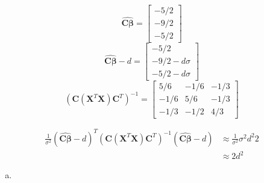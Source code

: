 \documentclass[paper=a4, fontsize=11pt]{scrartcl} %
\newcommand{\vecBeta}{\mathbf{\beta}}
\newcommand{\matC}{\mathbf{C}}
\newcommand{\matX}{\mathbf{X}}
\begin{document}
$$
\widehat{\matC \vecBeta} = 
\begin{bmatrix} -5/2\\
                              -9/2\\
                             -5/2
\end{bmatrix}
$$
$$
\widehat{\matC \vecBeta} - d = 
\begin{bmatrix} -5/2\\
                              -9/2 - d\sigma\\
                             -5/2 - d\sigma 
\end{bmatrix}
$$
$$
(\matC (\matX^T \matX ) \matC^T)^{-1} = 
\begin{bmatrix} 5/6 & -1/6& -1/3 \\
                             -1/6 & 5/6 & -1/3 \\
                             -1/3& -1/2 & 4/3
\end{bmatrix}
$$


\begin{align*}
\frac{1}{\sigma^2}(\widehat{\matC \vecBeta} - d)^T (\matC (\matX^T \matX ) \matC^T)^{-1}  (\widehat{\matC \vecBeta} - d) &\approx  
\frac{1}{\sigma^2} \sigma^2 d^2 2\\
&\approx    2 d^2
\end{align*}

\begin{enumerate}[(a)]

\item 

\end{enumerate}

\bigskip
\bigskip
\end{document}

